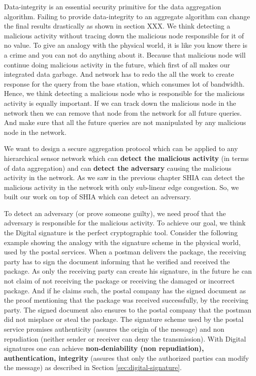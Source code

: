 	Data-integrity is an essential security primitive for the data aggregation algorithm.
	Failing to provide data-integrity to an aggregate algorithm can change the final results drastically as shown in section XXX.
	We think detecting a malicious activity without tracing down the malicious node responsible for it of no value.
	To give an analogy with the physical world, it is like you know there is a crime and you can not do anything about it.
	Because that malicious node will continue doing malicious activity in the future, which first of all makes our integrated data garbage. 
	And network has to redo the all the work to create response for the query from the base station, which consumes lot of bandwidth. 
	Hence, we think detecting a malicious node who is responsible for the malicious activity is equally important.
	If we can track down the malicious node in the network then we can remove that node from the network for all future queries.
	And make sure that all the future queries are not manipulated by any malicious node in the network.
	

	We want to design a secure aggregation protocol which can be applied to any hierarchical sensor network which can \textbf{detect the malicious activity} (in terms of data aggregation) and can \textbf{detect the adversary} causing the malicious activity in the network.  
	As we saw in the previous chapter SHIA can detect the malicious activity in the network with only sub-linear edge congestion.
	So, we built our work on top of SHIA which can detect an adversary.

	To detect an adversary (or prove someone guilty), we need proof that the adversary is responsible for the malicious activity.	 
	To achieve our goal, we think the Digital signature is the perfect cryptographic tool.
	Consider the following example showing the analogy with the signature scheme in the physical world, used by the postal services.
	When a postman delivers the package, the receiving party has to sign the document informing that he verified and received the package.
	As only the receiving party can create his signature, in the future he can not claim of not receiving the package or receiving the damaged or incorrect package. 
	And if he claims such, the postal company has the
	signed document as the proof mentioning that the package was received successfully, by the receiving party.
	The signed document also ensures to the postal company that the postman did not misplace or steal the package.
	The signature scheme used by the postal service promises authenticity (assures the origin of the message) and non repudiation (neither sender or receiver can deny the transmission).
	With Digital signatures one can achieve \textbf{non-deniability  (non repudiation), authentication, integrity} (assures that only the authorized parties can modify the message) as described in Section \ref{sec:digital-signature}.
	
